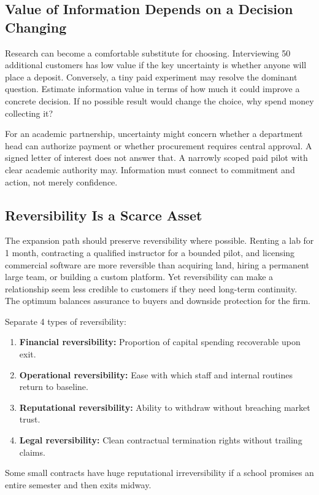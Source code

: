 \subsection{Value of Information Depends on a Decision Changing}
\label{sec:value_of_information_decision_changing}

Research can become a comfortable substitute for choosing. Interviewing 50 additional customers has low value if the key uncertainty is whether anyone will place a deposit. Conversely, a tiny paid experiment may resolve the dominant question. Estimate information value in terms of how much it could improve a concrete decision. If no possible result would change the choice, why spend money collecting it?

For an academic partnership, uncertainty might concern whether a department head can authorize payment or whether procurement requires central approval. A signed letter of interest does not answer that. A narrowly scoped paid pilot with clear academic authority may. Information must connect to commitment and action, not merely confidence.

\subsection{Reversibility Is a Scarce Asset}
\label{sec:reversibility_scarce_asset}

The expansion path should preserve reversibility where possible. Renting a lab for 1 month, contracting a qualified instructor for a bounded pilot, and licensing commercial software are more reversible than acquiring land, hiring a permanent large team, or building a custom platform. Yet reversibility can make a relationship seem less credible to customers if they need long-term continuity. The optimum balances assurance to buyers and downside protection for the firm.

Separate 4 types of reversibility:
\begin{enumerate}
    \item \textbf{Financial reversibility:} Proportion of capital spending recoverable upon exit.
    \item \textbf{Operational reversibility:} Ease with which staff and internal routines return to baseline.
    \item \textbf{Reputational reversibility:} Ability to withdraw without breaching market trust.
    \item \textbf{Legal reversibility:} Clean contractual termination rights without trailing claims.
\end{enumerate}
Some small contracts have huge reputational irreversibility if a school promises an entire semester and then exits midway.

